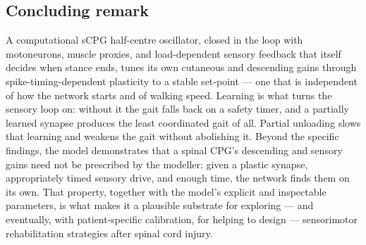 \subsection{Concluding remark}
A computational sCPG half-centre oscillator, closed in the loop with
motoneurons, muscle proxies, and load-dependent sensory feedback that itself
decides when stance ends, tunes its own cutaneous and descending gains through
spike-timing-dependent plasticity to a stable set-point --- one that is
independent of how the network starts and of walking speed. Learning is what
turns the sensory loop on: without it the gait falls back on a safety timer,
and a partially learned synapse produces the least coordinated gait of all.
Partial unloading slows that learning and weakens the gait without abolishing
it. Beyond the specific findings, the model
demonstrates that a spinal CPG's descending and sensory gains need not be
prescribed by the modeller: given a plastic synapse, appropriately timed
sensory drive, and enough time, the network finds them on its own. That
property, together with the model's explicit and inspectable parameters,
is what makes it a plausible substrate for exploring --- and eventually,
with patient-specific calibration, for helping to design --- sensorimotor
rehabilitation strategies after spinal cord injury.
